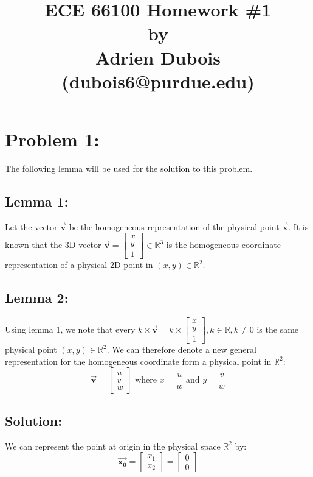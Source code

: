 \documentclass{article}
\title{\Large \textbf{ECE 66100 Homework \#1\\[0.1in] by\\ [0.1in] Adrien Dubois (dubois6@purdue.edu)}}
\begin{document}
\maketitle
\section*{Problem 1:}
The following lemma will be used for the solution to this problem.

\subsection*{Lemma 1:} Let the vector $\boldsymbol{\Vec{v}}$ be the homogeneous representation of the physical point $\boldsymbol{\Vec{x}}$. It is known that the 3D vector \(\boldsymbol{\Vec{v}} = \begin{bmatrix}
    x \\ y \\ 1
\end{bmatrix} \in \mathbb{R}^3\) is the homogeneous coordinate representation of a physical 2D point in \((x, y) \in \mathbb{R}^2\). 

\subsection*{Lemma 2:} Using lemma 1, we note that every \(k \times \boldsymbol{\Vec{v}} = k \times \begin{bmatrix}
    x \\ y \\ 1
\end{bmatrix}, k\in\mathbb{R}, k \neq 0\) is the same physical point \((x,y)\in \mathbb{R}^2\). We can therefore denote a new general representation for the homogeneous coordinate form a physical point in $\mathbb{R}^2$: 
\[
\boldsymbol{\Vec{v}} = 
\begin{bmatrix}
    u \\ v \\ w
\end{bmatrix} \text{ where } x = \frac{u}{w} \text{ and } y = \frac{v}{w}\]

\subsection*{Solution:}
We can represent the point at origin in the physical space $\mathbb{R}^2$ by: 
\[\boldsymbol{\Vec{x_0}} = 
    \begin{bmatrix}
        x_1 \\ x_2
    \end{bmatrix}
= \begin{bmatrix}
    0 \\ 0
\end{bmatrix}\]
\end{document}
